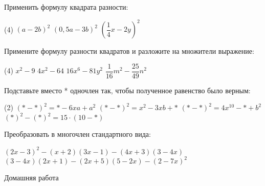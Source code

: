 \begin{class}[number=1]
\begin{listofex}
		\item Применить формулу квадрата разности:
		\begin{tasks}(4)
			\task \( (a-2b)^2 \)
			\task \( (0,5a-3b)^2 \)
			\task \( \left( \dfrac{1}{4}x-2y \right)^2 \)
		\end{tasks}
		\item Примените формулу разности квадратов и разложите на множители выражение:
		\begin{tasks}(4)
			\task \( x^2-9 \)
			\task \( 4x^2-64 \)
			\task \( 16x^6-81y^2 \)
			\task \( \dfrac{1}{16}m^2-\dfrac{25}{49}n^2 \)
		\end{tasks}
		\item Подставьте вместо * одночлен так, чтобы полученное равенство было верным:
		\begin{tasks}(2)
			\task \( (*-*)^2=*-6xa+a^2 \)
			\task \( (*-*)^2=x^2-3xb+* \)
			\task \( (*-*)^2=4x^{10}-*+b^2 \)
			\task \( (*)^2-(*)^2= 15 \cdot (10-*) \)
		\end{tasks}
		\item Преобразовать в многочлен стандартного вида:
		\begin{itasks}[1]
			\task \( (2x-3)^2-(x+2)(3x-1)-(4x+3)(3-4x) \)
			\task \( (3-4x)(2x+1)-(2x+5)(5-2x)-(2-7x)^2 \)
		\end{itasks}
	\end{listofex}
\end{class}

\begin{homework}[number=1]
		\begin{listofex}
			\item Домашняя работа
		\end{listofex}
\end{homework}

